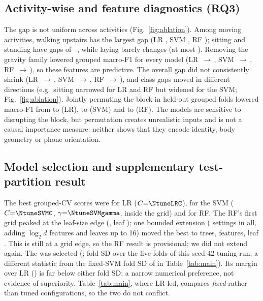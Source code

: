\documentclass{article}
\begin{document}
\subsection{Activity-wise and feature diagnostics (RQ3)}
The gap is not uniform across activities (Fig.~\ref{fig:ablation}). Among moving activities, walking upstairs has the largest gap (LR \NdropLRUpstairs, SVM \NdropSVMUpstairs, RF \NdropRFUpstairs); sitting and standing have gaps of \NdropSVMStand--\NdropRFSit, while laying barely changes (at most \NdropLRLay).
Removing the gravity family lowered grouped macro-F1 for every model (LR \NablLRMacroPfull{}\,$\to$\,\NablLRMacroPng, SVM \NablSVMMacroPfull{}\,$\to$\,\NablSVMMacroPng, RF \NablRFMacroPfull{}\,$\to$\,\NablRFMacroPng), so these features are predictive. The overall gap did not consistently shrink (LR \NablLRMacrofull{}\,$\to$\,\NablLRMacrong, SVM \NablSVMMacrofull{}\,$\to$\,\NablSVMMacrong, RF \NablRFMacrofull{}\,$\to$\,\NablRFMacrong), and class gaps moved in different directions (e.g.\ sitting narrowed for LR and RF but widened for the SVM; Fig.~\ref{fig:ablation}). Jointly permuting the block in held-out grouped folds lowered macro-F1 from \NpermLRbase{} to \NpermLR{} (LR), \NpermSVMbase{} to \NpermSVM{} (SVM) and \NpermRFbase{} to \NpermRF{} (RF). The models are sensitive to disrupting the block, but permutation creates unrealistic inputs and is not a causal importance measure; neither shows that they encode identity, body geometry or phone orientation.

\subsection{Model selection and supplementary test-partition result}
\label{sec:select}
The best grouped-CV scores were \NtuneLR{} for LR ($C{=}\NtuneLRC$), \NtuneSVM{} for the SVM ($C{=}\NtuneSVMC$, $\gamma{=}\NtuneSVMgamma$, inside the grid) and \NtuneRF{} for RF. The RF's first grid peaked at the leaf-size edge (\NtuneRFone, leaf \NtuneRFoneleaf); one bounded extension (\NtuneRFn{} settings in all, adding $\log_2 d$ features and leaves up to 16) moved the best to \NtuneRFtrees{} trees, \NtuneRFmf{} features, leaf \NtuneRFleaf. This is still at a grid edge, so the RF result is provisional; we did not extend again. The \Nselmodel{} was selected (\Nselcv; fold SD \Nselcvsd{} over the five folds of this seed-42 tuning run, a different statistic from the fixed-SVM fold SD of \NfsdSVMP{} in Table~\ref{tab:main}). Its margin over LR (\Nselmargin) is far below either fold SD: a narrow numerical preference, not evidence of superiority. Table~\ref{tab:main}, where LR led, compares \emph{fixed} rather than tuned configurations, so the two do not conflict.
\end{document}
